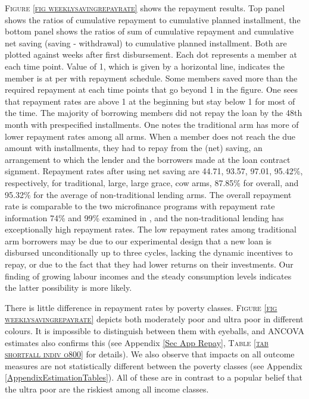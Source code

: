 	\textsc{\footnotesize Figure \ref{fig weeklysavingrepayrate}} shows the repayment results. Top panel shows the ratios of cumulative repayment to cumulative planned installment, the bottom panel shows the ratios of sum of cumulative repayment and cumulative net saving (saving - withdrawal) to cumulative planned installment. Both are plotted against weeks after first disbursement. Each dot represents a member at each time point. Value of 1, which is given by a horizontal line, indicates the member is at per with repayment schedule. Some members saved more than the required repayment at each time points that go beyond 1 in the figure. One sees that repayment rates are above 1 at the beginning but stay below 1 for most of the time. The majority of borrowing members did not repay the loan by the 48th month with prespecified installments. One notes the \textsf{traditional} arm has more of lower repayment rates among all arms. When a member does not reach the due amount with installments, they had to repay from the (net) saving, an arrangement to which the lender and the borrowers made at the loan contract signment. Repayment rates after using net saving are 44.71, 93.57, 97.01, 95.42\%, respectively, for \textsf{traditional, large, large grace, cow} arms, 87.85\% for overall, and 95.32\% for the average of non-\textsf{traditional} lending arms. %
	The overall repayment rate is comparable to the two microfinance programs with repayment rate information 74\% and 99\% examined in \citet{BanerjeeKarlanZinman2015}, and the non-\textsf{traditional} lending has exceptionally high repayment rates. The low repayment rates among \textsf{traditional} arm borrowers may be due to our experimental design that a new loan is disbursed unconditionally up to three cycles, lacking the dynamic incentives to repay, or due to the fact that they had lower returns on their investments. Our finding of growing labour incomes and the steady consumption levels indicates the latter possibility is more likely. 

	There is little difference in repayment rates by poverty classes. \textsc{\footnotesize Figure \ref{fig weeklysavingrepayrate}} depicts both moderately poor and ultra poor in different colours. It is impossible to distinguish between them with eyeballs, and ANCOVA estimates also confirms this  (see Appendix \ref{Sec App Repay}, \textsc{\small Table \ref{tab shortfall indiv o800}} for details). We also observe that impacts on all outcome measures are not statistically different between the poverty classes (see Appendix \ref{AppendixEstimationTables}). All of these are in contrast to a popular belief that the ultra poor are the riskiest among all income classes. %

